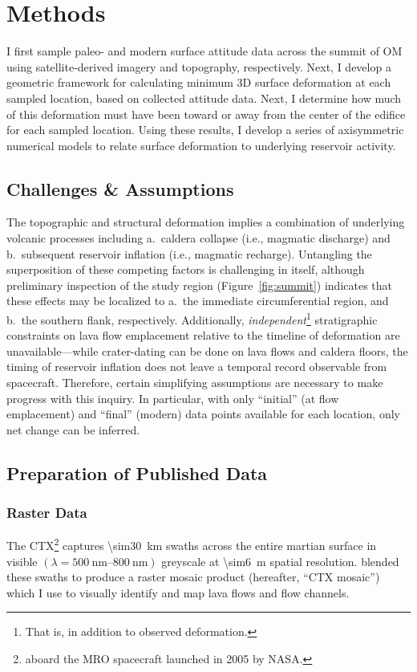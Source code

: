 \chapter{Methods}\label{cha:methods}

I first sample paleo- and modern surface attitude data across the summit of \acl{OM} using satellite-derived imagery and topography, respectively. Next, I develop a geometric framework for calculating minimum 3D surface deformation at each sampled location, based on collected attitude data. Next, I determine how much of this deformation must have been toward or away from the center of the edifice for each sampled location. Using these results, I develop a series of axisymmetric numerical models to relate surface deformation to underlying reservoir activity.

\section{Challenges \& Assumptions}
The topographic and structural deformation implies a combination of underlying volcanic processes including a.\ caldera collapse (i.e., magmatic discharge) and b.\ subsequent reservoir inflation (i.e., magmatic recharge). Untangling the superposition of these competing factors is challenging in itself, although preliminary inspection of the study region (Figure~\ref{fig:summit}) indicates that these effects may be localized to a.\ the immediate circumferential region, and b.\ the southern flank, respectively. Additionally, \textit{independent}\footnote{That is, in addition to observed deformation.} stratigraphic constraints on lava flow emplacement relative to the timeline of deformation are unavailable---while crater-dating can be done on lava flows and caldera floors, the timing of reservoir inflation does not leave a temporal record observable from spacecraft. Therefore, certain simplifying assumptions are necessary to make progress with this inquiry. In particular, with only ``initial'' (at flow emplacement) and ``final'' (modern) data points available for each location, only net change can be inferred.

\section{Preparation of Published Data}

\subsection{Raster Data}
The \acf{CTX}\footnote{aboard the \ac{MRO} spacecraft launched in 2005 by \acs{NASA}.} captures \qty{\sim30}{\km} swaths across the entire martian surface in visible $(\lambda=\qtyrange{500}{800}{\nm})$ greyscale at \qty{\sim6}{\m} spatial resolution. \textcite{Dickson2018AGB} blended these swaths to produce a raster mosaic product (hereafter, ``\ac{CTX} mosaic'') which I use to visually identify and map lava flows and flow channels.


